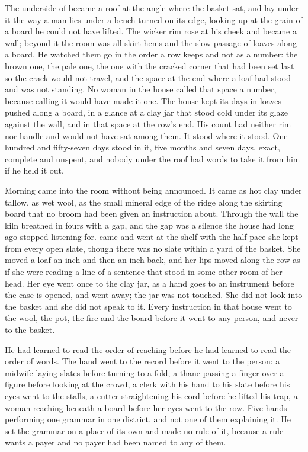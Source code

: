 
The underside of  became a roof at the angle where the basket sat, and  lay under it the way a man lies under a bench turned on its edge, looking up at the grain of a board he could not have lifted. The wicker rim rose at his cheek and became a wall; beyond it the room was all skirt-hems and the slow passage of loaves along a board. He watched them go in the order a row keeps and not as a number: the brown one, the pale one, the one with the cracked corner that had been set last so the crack would not travel, and the space at the end where a loaf had stood and was not standing. No woman in the house called that space a number, because calling it would have made it one. The house kept its days in loaves pushed along a board, in a glance at a clay jar that stood cold under its glaze against the wall, and in that space at the row's end. His count had neither rim nor handle and would not have sat among them. It stood where it stood. One hundred and fifty-seven days stood in it, five months and seven days, exact, complete and unspent, and nobody under the roof had words to take it from him if he held it out.

Morning came into the room without being announced. It came as hot clay under tallow, as wet wool, as the small mineral edge of the  ridge along the skirting board that no broom had been given an instruction about. Through the wall the kiln breathed in fours with a gap, and the gap was a silence the house had long ago stopped listening for.  came and went at the shelf with the half-pace she kept from every open slate, though there was no slate within a yard of the basket. She moved a loaf an inch and then an inch back, and her lips moved along the row as if she were reading a line of a sentence that stood in some other room of her head. Her eye went once to the clay jar, as a hand goes to an instrument before the case is opened, and went away; the jar was not touched. She did not look into the basket and she did not speak to it. Every instruction in that house went to the wool, the pot, the fire and the board before it went to any person, and never to the basket.

He had learned to read the order of reaching before he had learned to read the order of words. The hand went to the record before it went to the person: a midwife laying slates before turning to a fold, a thane passing a finger over a figure before looking at the crowd, a clerk with his hand to his slate before his eyes went to the stalls, a cutter straightening his cord before he lifted his trap, a woman reaching beneath a board before her eyes went to the row. Five hands performing one grammar in one district, and not one of them explaining it. He set the grammar on a place of its own and made no rule of it, because a rule wants a payer and no payer had been named to any of them.

